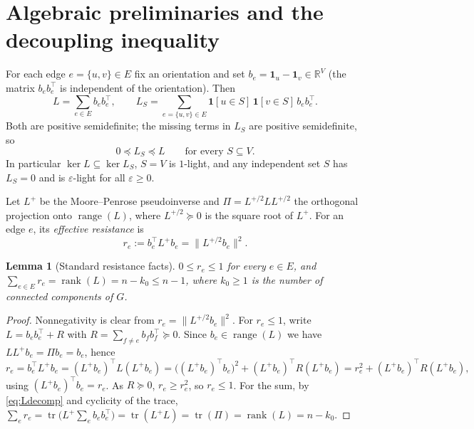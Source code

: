 \documentclass[12pt]{article}
\newtheorem{lemma}{Lemma}
\theoremstyle{definition}
\DeclareMathOperator{\tr}{tr}
\DeclareMathOperator{\rank}{rank}
\newcommand{\bR}{\mathbb{R}}
\newcommand{\eps}{\varepsilon}
\newcommand{\psd}{\succeq 0}
\begin{document}
\section{Algebraic preliminaries and the decoupling inequality}\label{sec:basics}

For each edge $e=\{u,v\}\in E$ fix an orientation and set $b_e=\mathbf 1_u-\mathbf 1_v\in\bR^V$ (the
matrix $b_eb_e^\top$ is independent of the orientation). Then
\begin{equation}\label{eq:Ldecomp}
L=\sum_{e\in E} b_e b_e^\top,
\qquad
L_S=\sum_{e=\{u,v\}\in E}\mathbf 1[u\in S]\,\mathbf 1[v\in S]\,b_e b_e^\top .
\end{equation}
Both are positive semidefinite; the missing terms in $L_S$ are positive semidefinite, so
\begin{equation}\label{eq:LSleqL}
0\preceq L_S\preceq L\qquad\text{for every }S\subseteq V .
\end{equation}
In particular $\ker L\subseteq\ker L_S$, $S=V$ is $1$-light, and any independent set $S$ has $L_S=0$
and is $\eps$-light for all $\eps\ge0$.

Let $L^{+}$ be the Moore--Penrose pseudoinverse and $\Pi=L^{+/2}LL^{+/2}$ the orthogonal projection
onto $\operatorname{range}(L)$, where $L^{+/2}\psd$ is the square root of $L^{+}$. For an edge $e$,
its \emph{effective resistance} is
\begin{equation}\label{eq:resistance}
r_e:=b_e^\top L^{+}b_e=\big\|L^{+/2}b_e\big\|^2 .
\end{equation}

\begin{lemma}[Standard resistance facts]\label{lem:resfacts}
$0\le r_e\le 1$ for every $e\in E$, and $\sum_{e\in E}r_e=\rank(L)=n-k_0\le n-1$, where $k_0\ge1$ is
the number of connected components of $G$.
\end{lemma}
\begin{proof}
Nonnegativity is clear from $r_e=\|L^{+/2}b_e\|^2$. For $r_e\le1$, write
$L=b_eb_e^\top+R$ with $R=\sum_{f\ne e}b_fb_f^\top\psd$. Since $b_e\in\operatorname{range}(L)$ we have
$LL^{+}b_e=\Pi b_e=b_e$, hence
\[
r_e=b_e^\top L^{+}b_e=(L^{+}b_e)^\top L (L^{+}b_e)
=\big((L^{+}b_e)^\top b_e\big)^2+(L^{+}b_e)^\top R (L^{+}b_e)
=r_e^2+(L^{+}b_e)^\top R (L^{+}b_e),
\]
using $(L^{+}b_e)^\top b_e=r_e$. As $R\psd$, $r_e\ge r_e^2$, so $r_e\le1$. For the sum, by
\eqref{eq:Ldecomp} and cyclicity of the trace,
$\sum_e r_e=\tr\!\big(L^{+}\sum_e b_eb_e^\top\big)=\tr(L^{+}L)=\tr(\Pi)=\rank(L)=n-k_0$.
\end{proof}
\end{document}
